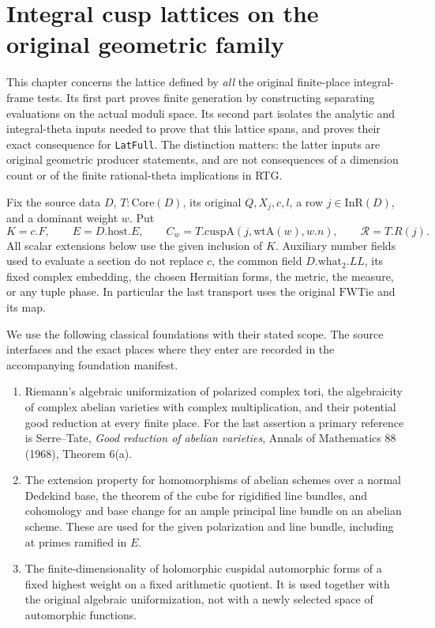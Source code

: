 \section{Integral cusp lattices on the original geometric family}
\label{sec:icl-v46}

This chapter concerns the lattice defined by \emph{all} the original
finite-place integral-frame tests.  Its first part proves finite generation
by constructing separating evaluations on the actual moduli space.  Its
second part isolates the analytic and integral-theta inputs needed to prove
that this lattice spans, and proves their exact consequence for
\texttt{LatFull}.  The distinction matters: the latter inputs are original
geometric producer statements, and are not consequences of a dimension
count or of the finite rational-theta implications in RTG.

Fix the source data \(D\), \(T:\mathrm{Core}(D)\), its original
\(Q,X_j,c,l\), a row \(j\in\mathrm{InR}(D)\), and a dominant weight
\(w\).  Put
\[
 K=c.F,\qquad E=D.\mathrm{host}.E,\qquad
 C_w=T.\mathrm{cuspA}(j,\mathrm{wtA}(w),w.n),\qquad
 \mathcal R=T.R(j).
\]
All scalar extensions below use the given inclusion of \(K\).  Auxiliary
number fields used to evaluate a section do not replace \(c\), the common
field \(D.\mathrm{what}_2.LL\), its fixed complex embedding, the chosen
Hermitian forms, the metric, the measure, or any tuple phase.  In particular
the last transport uses the original \(\mathrm{FWTie}\) and its map.

We use the following classical foundations with their stated scope.
The source interfaces and the exact places where they enter are recorded
in the accompanying foundation manifest.

\begin{enumerate}
\item Riemann's algebraic uniformization of polarized complex tori, the
algebraicity of complex abelian varieties with complex multiplication,
and their potential good reduction at every finite place.  For the last
assertion a primary reference is Serre--Tate, \emph{Good reduction of
abelian varieties}, Annals of Mathematics 88 (1968), Theorem 6(a).
\item The extension property for homomorphisms of abelian schemes over
a normal Dedekind base, the theorem of the cube for rigidified line
bundles, and cohomology and base change for an ample principal line
bundle on an abelian scheme.  These are used for the given polarization
and line bundle, including at primes ramified in \(E\).
\item The finite-dimensionality of holomorphic cuspidal automorphic
forms of a fixed highest weight on a fixed arithmetic quotient.  It is
used together with the original algebraic uniformization, not with a
newly selected space of automorphic functions.
\end{enumerate}


